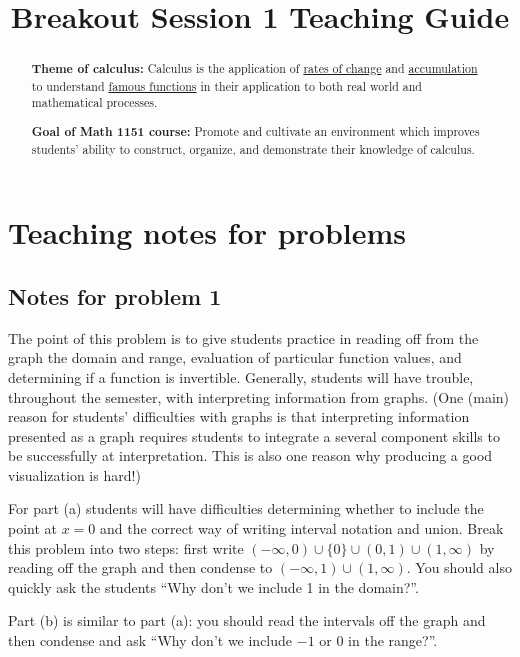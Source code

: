 \documentclass[nooutcomes]{ximera}
\title{Breakout Session 1 Teaching Guide}
\begin{document}
\begin{abstract}
  \textbf{Theme of calculus:} Calculus is the application of  \href{https://en.wikipedia.org/wiki/Derivative}{rates of change} and \href{https://en.wikipedia.org/wiki/Integral}{accumulation} to understand \href{https://en.wikipedia.org/wiki/Elementary_function}{famous functions} in their application to both real world and mathematical processes.

  \textbf{Goal of Math 1151 course:} Promote and cultivate an environment which improves students' ability to construct, organize, and demonstrate their knowledge of calculus.
\end{abstract}
\maketitle

\section{Teaching notes for problems}

\subsection*{Notes for problem 1}
The point of this problem is to give students practice in reading off from the graph the domain and range, evaluation of particular function values, and determining if a function is invertible.
Generally, students will have trouble, throughout the semester, with interpreting information from graphs.
(One (main) reason for students' difficulties with graphs is that interpreting information presented as a graph requires students to integrate a several component skills to be successfully at interpretation.
This is also one reason why producing a good visualization is hard!)

For part (a) students will have difficulties determining whether to include the point at $x = 0$ and the correct way of writing interval notation and union.
Break this problem into two steps: first write $(-\infty, 0) \cup \{0\} \cup (0, 1) \cup (1, \infty)$ by reading off the graph and then condense to $(-\infty, 1) \cup (1, \infty)$.
You should also quickly ask the students ``Why don't we include 1 in the domain?''.

Part (b) is similar to part (a): you should read the intervals off the graph and then condense and ask ``Why don't we include $-1$ or $0$ in the range?''.
\end{document}
